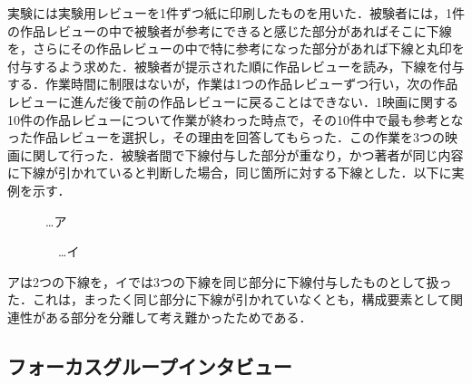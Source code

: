 \documentclass[japanese]{jnlp_1.3a}
\begin{document}
\begin{table}[p]
\begin{center}

    \vspace{\baselineskip}

    \vspace{\baselineskip}

\end{center}
\end{table}

実験には実験用レビューを1件ずつ紙に印刷したものを用いた．被験者には，1件の作品レビューの中で被験者が参考にできると感じた部分があればそこに下線を，さらにその作品レビューの中で特に参考になった部分があれば下線と丸印を付与するよう求めた．被験者が提示された順に作品レビューを読み，下線を付与する．作業時間に制限はないが，作業は1つの作品レビューずつ行い，次の作品レビューに進んだ後で前の作品レビューに戻ることはできない．1映画に関する10件の作品レビューについて作業が終わった時点で，その10件中で最も参考となった作品レビューを選択し，その理由を回答してもらった．この作業を3つの映画に関して行った．被験者間で下線付与した部分が重なり，かつ著者が同じ内容に下線が引かれていると判断した場合，同じ箇所に対する下線とした．以下に実例を示す．

\vspace{0.25\baselineskip}
\mbox{　　　…ア}

\vspace{0.25\baselineskip}
\mbox{　　　　…イ}


\vspace{0.5\baselineskip}
アは2つの下線を，イでは3つの下線を同じ部分に下線付与したものとして扱った．これは，まったく同じ部分に下線が引かれていなくとも，構成要素として関連性がある部分を分離して考え難かったためである．

\begin{table}[t]
\begin{center}

\end{center}
\end{table}

\subsection{フォーカスグループインタビュー}
\end{document}
